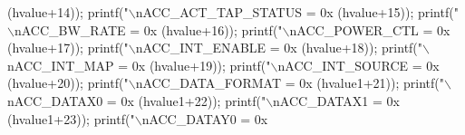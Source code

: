 \begin{DoxyCode}
{{{{{{{{{{{{{{{      (hvalue+14));
  printf(\textcolor{stringliteral}{"\(\backslash\)nACC\_ACT\_TAP\_STATUS = 0x%
      (hvalue+15));
  printf(\textcolor{stringliteral}{"\(\backslash\)nACC\_BW\_RATE = 0x%
      (hvalue+16));
  printf(\textcolor{stringliteral}{"\(\backslash\)nACC\_POWER\_CTL = 0x%
      (hvalue+17));
  printf(\textcolor{stringliteral}{"\(\backslash\)nACC\_INT\_ENABLE = 0x%
      (hvalue+18));
  printf(\textcolor{stringliteral}{"\(\backslash\)nACC\_INT\_MAP = 0x%
      (hvalue+19));
  printf(\textcolor{stringliteral}{"\(\backslash\)nACC\_INT\_SOURCE = 0x%
      (hvalue+20));
  printf(\textcolor{stringliteral}{"\(\backslash\)nACC\_DATA\_FORMAT = 0x%
      (hvalue1+21));
  printf(\textcolor{stringliteral}{"\(\backslash\)nACC\_DATAX0 = 0x%
      (hvalue1+22));
  printf(\textcolor{stringliteral}{"\(\backslash\)nACC\_DATAX1 = 0x%
      (hvalue1+23));
  printf(\textcolor{stringliteral}{"\(\backslash\)nACC\_DATAY0 = 0x%
}}}}}}}}}}}}}}}}}}}}}}}}}
\end{DoxyCode}
